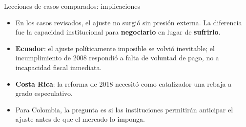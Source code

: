 \begin{frame}{Lecciones de casos comparados: implicaciones}
\begin{itemize}
  \item En los casos revisados, el ajuste no surgió sin presión externa. La diferencia fue la capacidad institucional para \textbf{negociarlo} en lugar de \textbf{sufrirlo}.
  \item \textbf{Ecuador}: el ajuste políticamente imposible se volvió inevitable; el incumplimiento de 2008 respondió a falta de voluntad de pago, no a incapacidad fiscal inmediata.
  \item \textbf{Costa Rica}: la reforma de 2018 necesitó como catalizador una rebaja a grado especulativo.
  \item Para Colombia, la pregunta es si las instituciones permitirán anticipar el ajuste antes de que el mercado lo imponga.
\end{itemize}
\end{frame}